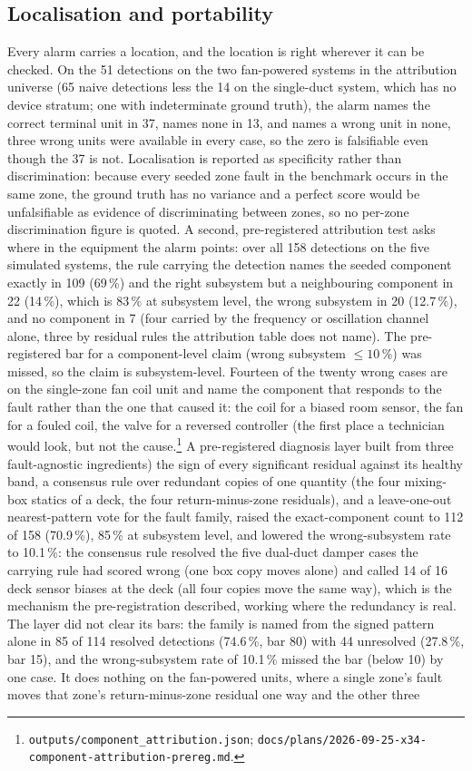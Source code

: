 \documentclass[11pt,letterpaper]{article}
\begin{document}
\subsection{Localisation and portability}

Every alarm carries a location, and the location is right wherever it can be checked. On the 51 detections on the two fan-powered systems in the attribution universe (65 naive detections less the 14 on the single-duct system, which has no device stratum; one with indeterminate ground truth), the alarm names the correct terminal unit in 37, names none in 13, and names a wrong unit in none, three wrong units were available in every case, so the zero is falsifiable even though the 37 is not. Localisation is reported as specificity rather than discrimination: because every seeded zone fault in the benchmark occurs in the same zone, the ground truth has no variance and a perfect score would be unfalsifiable as evidence of discriminating between zones, so no per-zone discrimination figure is quoted. A second, pre-registered attribution test asks where in the equipment the alarm points: over all 158 detections on the five simulated systems, the rule carrying the detection names the seeded component exactly in 109 (69\,\%) and the right subsystem but a neighbouring component in 22 (14\,\%), which is 83\,\% at subsystem level, the wrong subsystem in 20 (12.7\,\%), and no component in 7 (four carried by the frequency or oscillation channel alone, three by residual rules the attribution table does not name). The pre-registered bar for a component-level claim (wrong subsystem $\le 10\,\%$) was missed, so the claim is subsystem-level. Fourteen of the twenty wrong cases are on the single-zone fan coil unit and name the component that responds to the fault rather than the one that caused it: the coil for a biased room sensor, the fan for a fouled coil, the valve for a reversed controller (the first place a technician would look, but not the cause.\footnote{\texttt{outputs/component\_attribution.json}; \texttt{docs/plans/2026-09-25-x34-component-attribution-prereg.md}.} A pre-registered diagnosis layer built from three fault-agnostic ingredients) the sign of every significant residual against its healthy band, a consensus rule over redundant copies of one quantity (the four mixing-box statics of a deck, the four return-minus-zone residuals), and a leave-one-out nearest-pattern vote for the fault family, raised the exact-component count to 112 of 158 (70.9\,\%), 85\,\% at subsystem level, and lowered the wrong-subsystem rate to 10.1\,\%: the consensus rule resolved the five dual-duct damper cases the carrying rule had scored wrong (one box copy moves alone) and called 14 of 16 deck sensor biases at the deck (all four copies move the same way), which is the mechanism the pre-registration described, working where the redundancy is real. The layer did not clear its bars: the family is named from the signed pattern alone in 85 of 114 resolved detections (74.6\,\%, bar 80) with 44 unresolved (27.8\,\%, bar 15), and the wrong-subsystem rate of 10.1\,\% missed the bar (below 10) by one case. It does nothing on the fan-powered units, where a single zone's fault moves that zone's return-minus-zone residual one way and the other three 
\end{document}
